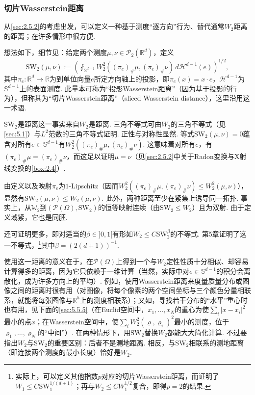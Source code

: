 \subsubsection{切片Wasserstein距离}\label{sec:5.5.4}

从\autoref{sec:2.5.2}的考虑出发，可以定义一种基于测度“逐方向”行为、替代通常$W_2$距离的距离；在许多情形中很方便.

想法如下，细节见\cite{b256}：给定两个测度$\mu,\nu\in\mathscr P_2(\mathbb R^d)$，定义
\[
\mathrm{SW}_2(\mu,\nu):=\left(\fint_{\mathbb S^{d-1}}W_2^2((\pi_e)_\#\mu,(\pi_e)_\#\nu)\,d\mathscr H^{d-1}(e)\right)^{1/2},
\]
其中$\pi_e:\mathbb R^d\to\mathbb R$为到单位向量$e$所定方向轴上的投影，即$\pi_e(x)=x\cdot e$，$\mathscr H^{d-1}$为$\mathbb S^{d-1}$上的表面测度. 此量本可称为“投影Wasserstein距离”（因为基于投影的行为），但\cite{b256}称其为“切片Wasserstein距离”（sliced Wasserstein distance），这里沿用这一术语.

$\mathrm{SW}_2$是距离这一事实来自$W_2$是距离. 三角不等式可由$W_2$的三角不等式（见\autoref{sec:5.1}）与$L^2$范数的三角不等式证明. 正性与对称性显然. 等式$\mathrm{SW}_2(\mu,\nu)=0$蕴含对所有$e\in\mathbb S^{d-1}$有$W_2^2((\pi_e)_\#\mu,(\pi_e)_\#\nu)$. 这意味着对所有$e$，有$(\pi_e)_\#\mu=(\pi_e)_\#\nu$，而这足以证明$\mu=\nu$（见\autoref{sec:2.5.2}中关于Radon变换与X射线变换的\autoref{box:2.4}）.

由定义以及映射$\pi_e$为$1$-Lipschitz（因而$W_2^2((\pi_e)_\#\mu,(\pi_e)_\#\nu)\le W_2^2(\mu,\nu)$），显然有$\mathrm{SW}_2(\mu,\nu)\le W_2(\mu,\nu)$. 此外，两种距离至少在紧集上诱导同一拓扑. 事实上，从$\mathbb W_2$到$(\mathscr P(\Omega),\mathrm{SW}_2)$的恒等映射连续（由$\mathrm{SW}_2\le W_2$）且为双射. 由于定义域紧，它也是同胚.

还可证明更多，即对适当的$\beta\in]0,1[$有形如$W_2\le C\mathrm{SW}_2^\beta$的不等式. \cite{b65}第5章证明了这一不等式，\footnote{实际上，可以定义其他指数$p$对应的切片Wasserstein距离，而\cite{b65}证明了$W_1\le C\mathrm{SW}_1^{1/(d+1)}$；再与$W_2\le CW_1^{1/2}$复合，即得$p=2$的结果.}其中$\beta=(2(d+1))^{-1}$.

\label{idx:root5-p215-images}使用这一距离的意义在于，在$\mathscr P(\Omega)$上得到一个与$W_2$定性性质十分相似、却容易计算得多的距离，因为它只依赖于一维计算（当然，实际中对$e\in\mathbb S^{d-1}$的积分会离散化，成为许多方向上的平均）. 例如，使用Wasserstein距离来度量质量分布或图像之间的距离时很有用（对图像，将每个像素的两个空间坐标与三个颜色分量相联系，就能将每张图像与$\mathbb R^5$上的测度相联系）；又如，寻找若干分布的“水平”重心时也有用，见下面的\autoref{sec:5.5.5}（在Euclid空间中，$x_1,\ldots,x_N$的重心为使$\sum_i|x-x_i|^2$最小的点$x$；在Wasserstein空间中，使$\sum_iW_2^2(\varrho,\varrho_i)^2$最小的测度，位于$\varrho_1,\ldots,\varrho_N$的“中间”）. 在两种情形下，用$\mathrm{SW}_2$替换$W_2$都能大大简化计算. 不过要指出$W_2$与$\mathrm{SW}_2$的重要区别：后者不是测地距离. 相反，与$\mathrm{SW}_2$相联系的测地距离（即连接两个测度的最小长度）恰好是$W_2$.

